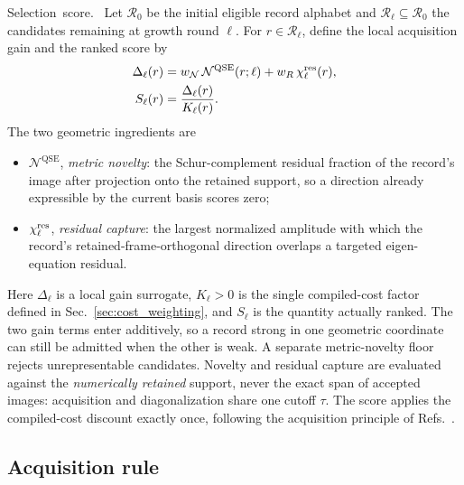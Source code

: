 \documentclass[
  reprint,
  amsmath,
  amssymb,
  aps,
  pra,
  nofootinbib,
  superscriptaddress,
  floatfix
]{revtex4-2}
\newcommand{\tentative}[1]{\textcolor{red!70!black}{#1}}
\newcommand{\structlabel}[1]{\noindent\mbox{\tentative{#1.}}~}
\newcommand{\Ncal}{\mathcal{N}}
\newcommand{\qse}{\mathrm{QSE}}
\begin{document}
\structlabel{Selection score}
Let $\mathcal R_0$ be the initial eligible record alphabet and
$\mathcal R_\ell\subseteq\mathcal R_0$ the candidates remaining at growth
round $\ell$.  For $r\in\mathcal R_\ell$, define the local acquisition gain
and the ranked score by
\begin{align}
\Delta_\ell(r)
&=
w_{\Ncal}\,\Ncal^{\qse}(r;\ell)
+w_{R}\,\chi_\ell^{\rm res}(r),
\label{eq:qse_geometric_surrogate}\\
S_\ell(r)
&=
\frac{\Delta_\ell(r)}{K_\ell(r)}.
\label{eq:qse_score_topdown}
\end{align}
The two geometric ingredients are
\begin{itemize}
\item $\Ncal^{\qse}$, \emph{metric novelty}: the Schur-complement residual fraction of the record's image after projection onto the retained support, so a direction already expressible by the current basis scores zero;
\item $\chi_\ell^{\rm res}$, \emph{residual capture}: the largest normalized amplitude with which the record's retained-frame-orthogonal direction overlaps a targeted eigen-equation residual.
\end{itemize}
Here $\Delta_\ell$ is a local gain surrogate, $K_\ell>0$ is the single
compiled-cost factor defined in Sec.~\ref{sec:cost_weighting}, and $S_\ell$ is
the quantity actually ranked.  The two gain terms enter additively, so a
record strong in one geometric coordinate can still be admitted when the
other is weak.  A separate metric-novelty floor rejects unrepresentable
candidates.  Novelty and residual capture are evaluated against the
\emph{numerically retained} support, never the exact span of accepted images:
acquisition and diagonalization share one cutoff $\tau$.  The score applies
the compiled-cost discount exactly once, following the acquisition principle
of Refs.~\cite{PaperI,PaperII}.

\subsection{Acquisition rule}
\label{sec:acquisition_objective}
\end{document}
